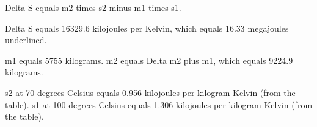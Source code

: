 Delta S equals m2 times s2 minus m1 times s1.

Delta S equals 16329.6 kilojoules per Kelvin, which equals 16.33 megajoules underlined.

m1 equals 5755 kilograms.
m2 equals Delta m2 plus m1, which equals 9224.9 kilograms.

s2 at 70 degrees Celsius equals 0.956 kilojoules per kilogram Kelvin (from the table).
s1 at 100 degrees Celsius equals 1.306 kilojoules per kilogram Kelvin (from the table).